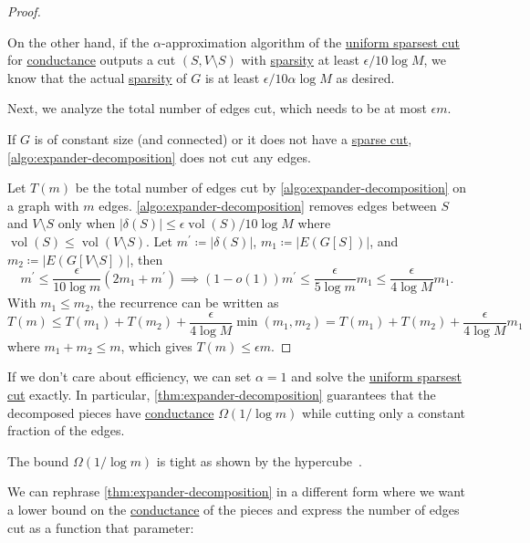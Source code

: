 \begin{proof}
\begin{explanation}
		On the other hand, if the \(\alpha \)-approximation algorithm of the \hyperref[prb:sparsest-cut]{uniform sparsest cut} for \hyperref[def:conductance]{conductance} outputs a cut \((S, V\setminus S)\) with \hyperref[def:sparsity]{sparsity} at least \(\epsilon / 10\log M\), we know that the actual \hyperref[def:sparsity]{sparsity} of \(G\) is at least \(\epsilon / 10 \alpha \log M\) as desired.
	\end{explanation}

	Next, we analyze the total number of edges cut, which needs to be at most \(\epsilon m\).
	\begin{intuition}
		If \(G\) is of constant size (and connected) or it does not have a \hyperref[prb:sparsest-cut]{sparse cut}, \autoref{algo:expander-decomposition} does not cut any edges.
	\end{intuition}
	Let \(T(m)\) be the total number of edges cut by \autoref{algo:expander-decomposition} on a graph with \(m\) edges. \autoref{algo:expander-decomposition} removes edges between \(S\) and \(V\setminus S\) only when \(\lvert \delta (S) \rvert \leq \epsilon \operatorname{vol}(S) / 10 \log M \) where \(\operatorname{vol}(S) \leq \operatorname{vol}(V \setminus S) \). Let \(m^{\prime} \coloneqq \lvert \delta (S) \rvert \), \(m_1 \coloneqq \lvert E(G[S]) \rvert \), and \(m_2 \coloneqq \lvert E(G[V\setminus S]) \rvert\), then
	\[
		m^{\prime}
		\leq \frac{\epsilon }{10 \log m} (2m_1 + m^{\prime} )
		\implies (1 - o(1)) m^{\prime} \leq \frac{\epsilon }{5 \log m} m_1
		\leq \frac{\epsilon }{4 \log M} m_1.
	\]
	With \(m_1 \leq m_2\), the recurrence can be written as
	\[
		T(m)
		\leq T(m_1) + T(m_2) + \frac{\epsilon }{4 \log M} \min (m_1, m_2)
		= T(m_1) + T(m_2) + \frac{\epsilon }{4 \log M} m_1
	\]
	where \(m_1 + m_2 \leq m\), which gives \(T(m) \leq \epsilon m\).
\end{proof}

If we don't care about efficiency, we can set \(\alpha = 1\) and solve the \hyperref[prb:sparsest-cut]{uniform sparsest cut} exactly. In particular, \autoref{thm:expander-decomposition} guarantees that the decomposed pieces have \hyperref[def:conductance]{conductance} \(\Omega (1 / \log m)\) while cutting only a constant fraction of the edges.

\begin{note}
	The bound \(\Omega (1 / \log m)\) is tight as shown by the hypercube~\cite{alev2017graph}.
\end{note}

We can rephrase \autoref{thm:expander-decomposition} in a different form where we want a lower bound on the \hyperref[def:conductance]{conductance} of the pieces and express the number of edges cut as a function that parameter:

